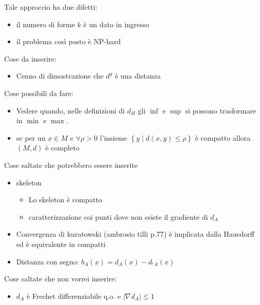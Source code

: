 \documentclass[a4paper,10pt]{article}
\theoremstyle{plain}
\theoremstyle{definition}
\theoremstyle{remark}
\newcommand{\set}[1]{\left\{#1\right\}}
\newcommand{\abs}[1]{\left|#1\right|}
\begin{document}
Tale approccio ha due difetti:
\begin{itemize}
\item il numero di forme $k$ è un dato in ingresso
\item il problema così posto è NP-hard
\end{itemize}








\newpage





\newpage

Cose da inserire:
\begin{itemize}
\item Cenno di dimostrazione che $d^g$ è una distanza
\end{itemize}

Cose possibili da fare:

\begin{itemize}
\item Vedere quando, nelle definizioni di $d_H$ gli $\inf$ e $\sup$ si
  possono trasformare in $\min$ e $\max$.
\item se per un $x \in M$ e $\forall \rho > 0$ l'insieme $\set{ y \mid
    d(x,y) \le \rho}$ è compatto allora $(M,d)$ è completo
\end{itemize}


Cose saltate che potrebbero essere inserite
\begin{itemize}
\item skeleton
  \begin{itemize}
  \item Lo skeleton è compatto
  \item caratterizzazione coi punti dove non esiste il gradiente di
    $d_A$
  \end{itemize}
\item Convergenza di kuratowski (ambrosio tilli p.77) è implicata
  dalla Hausdorff ed è equivalente in compatti
\item Distanza con segno: $b_A(x) = d_A(x) - d_{^cA}(x)$
\end{itemize}


Cose saltate che non vorrei inserire:
\begin{itemize}
\item $d_A$ è Frechet differenziabile q.o. e $\abs{\nabla d_A} \le 1$
\end{itemize}
\end{document}
